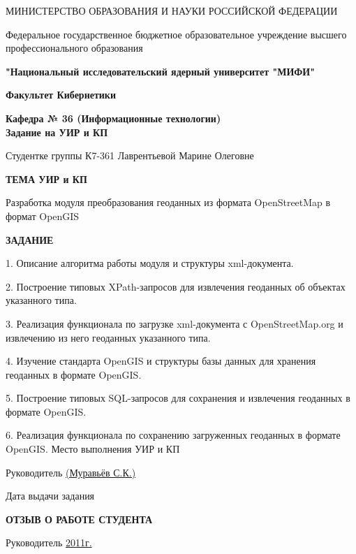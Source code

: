 \documentclass[12pt,a4paper,oneside]{article} %
\begin{document}
\onehalfspacing
\pagestyle{empty} %
\newpage
\begin{center}
{\small МИНИСТЕРСТВО ОБРАЗОВАНИЯ И НАУКИ РОССИЙСКОЙ ФЕДЕРАЦИИ

Федеральное государственное бюджетное образовательное учреждение высшего профессионального образования

\textbf{"Национальный исследовательский ядерный университет "МИФИ"}
\\[50pt]
}
\textbf{Факультет Кибернетики}

\textbf{Кафедра № 36 (Информационные технологии)
\\[50pt]
\Large{Задание на УИР и КП}}
\begin{flushleft}

Студентке группы К7-361 Лаврентьевой Марине Олеговне
\\[40pt]
\end{flushleft}

\textbf{ТЕМА УИР и КП}
\begin{flushleft}

Разработка модуля преобразования геоданных из формата OpenStreetMap в формат OpenGIS
\\[20pt]
\end{flushleft}
\textbf{ЗАДАНИЕ}
\end{center}
\begin{flushleft}
1. Описание алгоритма работы модуля и структуры xml-документа.

2. Построение типовых XPath-запросов для извлечения геоданных об объектах указанного типа.

3. Реализация функционала по загрузке xml-документа с OpenStreetMap.org и извлечению из него геоданных указанного типа.

4. Изучение стандарта OpenGIS и структуры базы данных для хранения геоданных в формате OpenGIS.

5. Построение типовых SQL-запросов для сохранения и извлечения геоданных в формате OpenGIS.

6. Реализация функционала по сохранению загруженных геоданных в формате OpenGIS.
\newpage
Место выполнения УИР и КП \underline{\hspace{9cm}}

Руководитель \underline{\hspace{9cm} (Муравьёв С.К.)}

Дата выдачи задания \underline{\hspace{11cm}}
\end{flushleft}

\newpage
\begin{center}
\textbf{ОТЗЫВ О РАБОТЕ СТУДЕНТА}
\end{center}
\vfill
Руководитель \underline{\hspace{6cm}\glqq{\hspace{1cm}}\grqq\hspace{4cm}2011г.}
\end{document}
